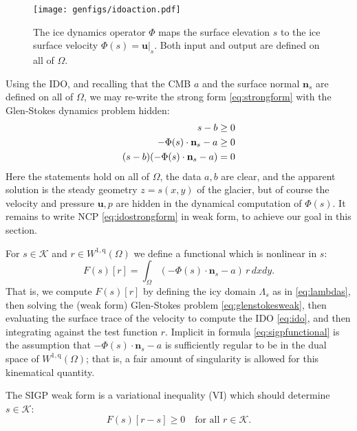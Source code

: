 \documentclass[letterpaper,final,12pt,reqno]{amsart}
\theoremstyle{claim}
\newcommand{\bn}{\mathbf{n}}
\newcommand{\bu}{\mathbf{u}}
\newcommand{\qq}{{\text{q}}}
\numberwithin{equation}{section}
\numberwithin{figure}{section}
\numberwithin{table}{section}
\numberwithin{theorem}{section}
\begin{document}
\begin{figure}[t]
\begin{center}
\texttt{[image: genfigs/idoaction.pdf]}
\end{center}
\caption{The ice dynamics operator $\Phi$ maps the surface elevation $s$ to the ice surface velocity $\Phi(s)=\bu|_s$.  Both input and output are defined on all of $\Omega$.}
\label{fig:idoaction}
\end{figure}

Using the IDO, and recalling that the CMB $a$ and the surface normal $\bn_s$ are defined on all of $\Omega$, we may re-write the strong form \eqref{eq:strongform} with the Glen-Stokes dynamics problem hidden:
\begin{align}
s - b &\ge 0  \label{eq:idostrongform} \\
- \Phi(s) \cdot \bn_s - a &\ge 0 \notag \\
(s - b) (- \Phi(s) \cdot \bn_s - a) &= 0 \notag
\end{align}
Here the statements hold on all of $\Omega$, the data $a,b$ are clear, and the apparent solution is the steady geometry $z=s(x,y)$ of the glacier, but of course the velocity and pressure $\bu,p$ are hidden in the dynamical computation of $\Phi(s)$.  It remains to write NCP \eqref{eq:idostrongform} in weak form, to achieve our goal in this section.

For $s \in \mathcal{K}$ and $r \in W^{1,\qq}(\Omega)$ we define a functional which is nonlinear in $s$:
\begin{equation}
F(s)[r] = \int_\Omega (- \Phi(s) \cdot \bn_s - a)\, r \,dx dy. \label{eq:sigpfunctional}
\end{equation}
That is, we compute $F(s)[r]$ by defining the icy domain $\Lambda_s$ as in \eqref{eq:lambdas}, then solving the (weak form) Glen-Stokes problem \eqref{eq:glenstokesweak}, then evaluating the surface trace of the velocity to compute the IDO \eqref{eq:ido}, and then integrating against the test function $r$.  Implicit in formula \eqref{eq:sigpfunctional} is the assumption that $- \Phi(s) \cdot \bn_s - a$ is sufficiently regular to be in the dual space of $W^{1,\qq}(\Omega)$; that is, a fair amount of singularity is allowed for this kinematical quantity.

The SIGP weak form is a variational inequality (VI) \cite{KinderlehrerStampacchia1980} which should determine $s\in\mathcal{K}$:
\begin{equation}
F(s)[r - s] \ge 0 \quad \text{for all $r \in \mathcal{K}$.}  \label{eq:sigpweakform}
\end{equation}
\end{document}
